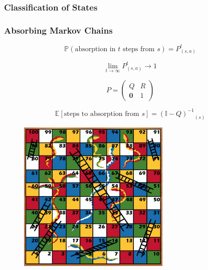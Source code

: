 \documentclass{beamer}
\begin{document}
\begin{frame}
\frametitle{Classification of States}
\begin{figure}
  
\end{figure}
\end{frame}


\begin{frame}
\frametitle{Absorbing Markov Chains}

\begin{tcolorbox}[colback=orange!25!yellow!25,colframe=orange!50!yellow,title=\textit{Probability of Absorption},coltitle=black]

\begin{equation*}
\mathbb{P}\left(\text{absorption in $t$ steps from } s\right) = P^{t}_{(s,a)}
\end{equation*}

\begin{equation*}
\lim_{t\to\infty}P^{t}_{(s,a)} \rightarrow 1
\end{equation*}
\end{tcolorbox}
\pause

\begin{tcolorbox}[colback=orange!25!yellow!25,colframe=orange!50!yellow,title=\textit{Mean Steps to Absorption},coltitle=black]

\begin{equation*}
P = \left(\begin{array}{cc}Q & R\\
\textbf{0} & 1\end{array}\right)
\end{equation*}

\begin{equation*}
\mathbb{E}\left[\text{steps to absorption from } s\right] = {\left(\mathbb{I} - Q\right)^{-1}}_{(s)}
\end{equation*}
\end{tcolorbox}

\end{frame}




\begin{frame}
\begin{figure}
  \includegraphics[width=0.65\textwidth]{snakes_and_ladders}
\end{figure}
\end{frame}
\end{document}
